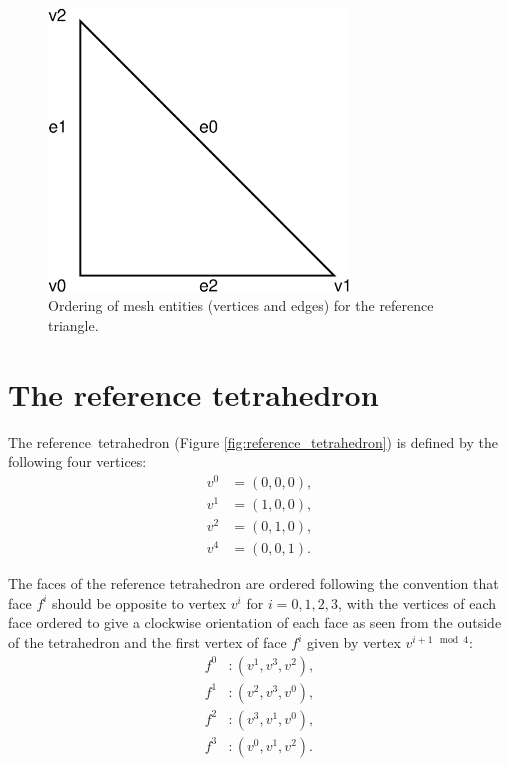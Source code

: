 \begin{figure}[htbp]
  \begin{center}
    \includegraphics[width=8cm]{eps/reference_triangle_entities.eps}
    \caption{Ordering of mesh entities (vertices and edges) for the reference triangle.}
    \label{fig:reference_triangle_entities}
  \end{center}
\end{figure}

\section{The reference tetrahedron}

The reference~tetrahedron (Figure \ref{fig:reference_tetrahedron})
is defined by the following four vertices:
\begin{equation}
  \begin{split}
    v^0 &= (0,0,0), \\
    v^1 &= (1,0,0), \\
    v^2 &= (0,1,0), \\
    v^4 &= (0,0,1).
  \end{split}
\end{equation}

The faces of the reference tetrahedron are ordered following the convention that face $f^i$ should be
opposite to vertex $v^i$ for $i=0,1,2,3$, with the vertices of each face ordered to give a
clockwise orientation of each face as seen from the outside of the tetrahedron and
the first vertex of face $f^i$ given by vertex $v^{i + 1 \mod 4}$:
\begin{equation}
  \begin{split}
    f^0 &: (v^1, v^3, v^2), \\
    f^1 &: (v^2, v^3, v^0), \\
    f^2 &: (v^3, v^1, v^0), \\
    f^3 &: (v^0, v^1, v^2).
  \end{split}
\end{equation}

